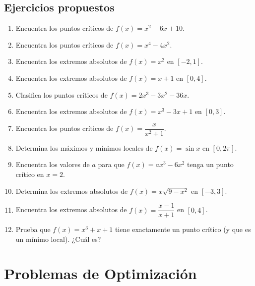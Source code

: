 \documentclass[12pt, a4paper]{article}
\begin{document}
\subsection{Ejercicios propuestos}

\begin{enumerate}[leftmargin=*]
  \item \facil{} Encuentra los puntos críticos de $f(x) = x^2 - 6x + 10$.

  \item \facil{} Encuentra los puntos críticos de $f(x) = x^4 - 4x^2$.

  \item \facil{} Encuentra los extremos absolutos de $f(x) = x^2$ en $[-2, 1]$.

  \item \facil{} Encuentra los extremos absolutos de $f(x) = x + 1$ en $[0, 4]$.

  \item \medio{} Clasifica los puntos críticos de $f(x) = 2x^3 - 3x^2 - 36x$.

  \item \medio{} Encuentra los extremos absolutos de $f(x) = x^3 - 3x + 1$ en $[0, 3]$.

  \item \medio{} Encuentra los puntos críticos de $f(x) = \dfrac{x}{x^2 + 1}$.

  \item \medio{} Determina los máximos y mínimos locales de $f(x) = \sin x$ en $[0, 2\pi]$.

  \item \dificil{} Encuentra los valores de $a$ para que $f(x) = ax^3 - 6x^2$ tenga un punto crítico en $x = 2$.

  \item \dificil{} Determina los extremos absolutos de $f(x) = x\sqrt{9 - x^2}$ en $[-3, 3]$.

  \item \dificil{} Encuentra los extremos absolutos de $f(x) = \dfrac{x - 1}{x + 1}$ en $[0, 4]$.

  \item \dificil{} Prueba que $f(x) = x^3 + x + 1$ tiene exactamente un punto crítico (y que es un mínimo local). ¿Cuál es?
\end{enumerate}

\newpage

\section{Problemas de Optimización}
\end{document}
